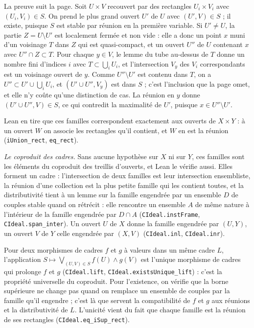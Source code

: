 La preuve suit la page. Soit $U \times V$ recouvert par des rectangles $U_i \times V_i$ avec $(U_i, V_i) \in S$. On prend le plus grand ouvert $U'$ de $U$ avec $(U', V) \in S$ ; il existe, puisque $S$ est stable par réunion en la première variable. Si $U' \neq U$, la partie $Z = U \setminus U'$ est localement fermée et non vide : elle a donc un point $x$ muni d'un voisinage $T$ dans $Z$ qui est quasi-compact, et un ouvert $U''$ de $U$ contenant $x$ avec $U'' \cap Z \subset T$. Pour chaque $y \in V$, le lemme du tube au-dessus de $T$ donne un nombre fini d'indices $i$ avec $T \subset \bigcup_i U_i$, et l'intersection $V_y$ des $V_i$ correspondants est un voisinage ouvert de $y$. Comme $U'' \setminus U'$ est contenu dans $T$, on a $U'' \subset U' \cup \bigcup_i U_i$, et $(U' \cup U'', V_y)$ est dans $S$ ; c'est l'inclusion que la page omet, et elle n'y coûte qu'une distinction de cas. La réunion en $y$ donne $(U' \cup U'', V) \in S$, ce qui contredit la maximalité de $U'$, puisque $x \in U'' \setminus U'$.

Lean en tire que ces familles correspondent exactement aux ouverts de $X \times Y$ : à un ouvert $W$ on associe les rectangles qu'il contient, et $W$ en est la réunion (\texttt{iUnion\_rect}, \texttt{eq\_rect}).

\noindent\emph{Le coproduit des cadres.} Sans aucune hypothèse sur $X$ ni sur $Y$, ces familles sont les éléments du coproduit des treillis d'ouverts, et Lean le vérifie aussi. Elles forment un cadre : l'intersection de deux familles est leur intersection ensembliste, la réunion d'une collection est la plus petite famille qui les contient toutes, et la distributivité tient à un lemme sur la famille engendrée par un ensemble $D$ de couples stable quand on rétrécit : elle rencontre un ensemble $A$ de même nature à l'intérieur de la famille engendrée par $D \cap A$ (\texttt{CIdeal.\allowbreak{}instFrame}, \texttt{CIdeal.\allowbreak{}span\_inter}). Un ouvert $U$ de $X$ donne la famille engendrée par $(U, Y)$, un ouvert $V$ de $Y$ celle engendrée par $(X, V)$ (\texttt{CIdeal.\allowbreak{}inl}, \texttt{CIdeal.\allowbreak{}inr}).

Pour deux morphismes de cadres $f$ et $g$ à valeurs dans un même cadre $L$, l'application $S \mapsto \bigvee_{(U, V) \in S} f(U) \wedge g(V)$ est l'unique morphisme de cadres qui prolonge $f$ et $g$ (\texttt{CIdeal.\allowbreak{}lift}, \texttt{CIdeal.\allowbreak{}existsUnique\_lift}) : c'est la propriété universelle du coproduit. Pour l'existence, on vérifie que la borne supérieure ne change pas quand on remplace un ensemble de couples par la famille qu'il engendre ; c'est là que servent la compatibilité de $f$ et $g$ aux réunions et la distributivité de $L$. L'unicité vient du fait que chaque famille est la réunion de ses rectangles (\texttt{CIdeal.\allowbreak{}eq\_iSup\_rect}).


